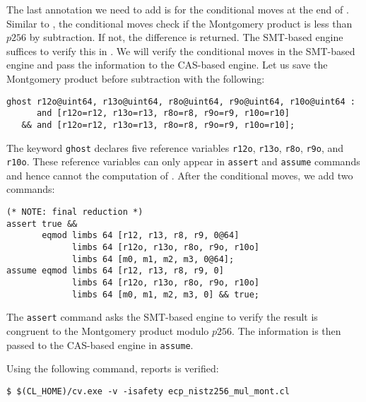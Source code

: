 \documentclass{amsproc}
\begin{document}
The last annotation we need to add is for the conditional moves at the
end of \nistzmul. Similar to \nistzadd, the conditional moves check if
the Montgomery product is less than $p256$ by subtraction. If not, the
difference is returned. The SMT-based engine suffices to verify this
in \nistzadd. We will verify the conditional moves in the SMT-based
engine and pass the information to the CAS-based engine. Let us save
the Montgomery product before subtraction with the following:
\begin{verbatim}
ghost r12o@uint64, r13o@uint64, r8o@uint64, r9o@uint64, r10o@uint64 :
      and [r12o=r12, r13o=r13, r8o=r8, r9o=r9, r10o=r10]
   && and [r12o=r12, r13o=r13, r8o=r8, r9o=r9, r10o=r10];
\end{verbatim}
The keyword \texttt{ghost} declares five reference variables
\texttt{r12o}, \texttt{r13o}, \texttt{r8o}, \texttt{r9o}, and
\texttt{r10o}. These reference variables can only appear in
\texttt{assert} and \texttt{assume} commands and hence cannot the
computation of \nistzmul. After the conditional moves, we add two
\cryptoline commands:
\begin{verbatim}
(* NOTE: final reduction *)
assert true &&
       eqmod limbs 64 [r12, r13, r8, r9, 0@64]
             limbs 64 [r12o, r13o, r8o, r9o, r10o]
             limbs 64 [m0, m1, m2, m3, 0@64];
assume eqmod limbs 64 [r12, r13, r8, r9, 0]
             limbs 64 [r12o, r13o, r8o, r9o, r10o]
             limbs 64 [m0, m1, m2, m3, 0] && true;
\end{verbatim}
The \texttt{assert} command asks the SMT-based engine to verify the
result is congruent to the Montgomery product modulo $p256$. The
information is then passed to the CAS-based engine in
\texttt{assume}. 

Using the following command, \cryptoline reports \nistzmul
is verified:
\begin{verbatim}
$ $(CL_HOME)/cv.exe -v -isafety ecp_nistz256_mul_mont.cl
\end{verbatim}
\end{document}

